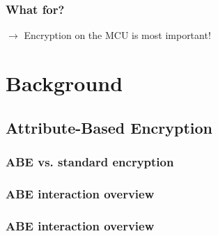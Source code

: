 \begin{frame}[c]
    \frametitle{What for?}
    \centering
    

    \alert{\large $\rightarrow$ Encryption on the MCU is most important!}
\end{frame}

\section{Background}
\subsection{Attribute-Based Encryption}
\begin{frame}[c]
    \frametitle{ABE vs. standard encryption}
    \begin{center}
        
    \end{center}
\end{frame}

\begin{frame}[c]
    \frametitle{ABE interaction overview}
    
\end{frame}

\begin{frame}[c]
    \frametitle{ABE interaction overview}
    
\end{frame}

